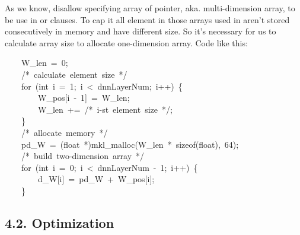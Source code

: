 \documentclass{article}
\begin{document}
\noindent{}As we know,  disallow specifying array of pointer, aka. multi-dimension array, to be use in  or  clauses. To cap it all element in those arrays used in  aren't stored consecutively in memory and have different size. So it's necessary for us to calculate array size to allocate one-dimension array. Code like this:%
\begin{mdpre}%
\noindent~~~~{W\_len}~=~{0};\\
~~~~{/*}{~calculate~element~size~}{*/}\\
~~~~{for}~({int}~i~=~{1};~i~\textless{}~dnnLayerNum;~i++)~\{\\
~~~~~~~~{W\_pos}[i~-~{1}]~=~{W\_len};\\
~~~~~~~~{W\_len}~+=~{/*}{~i-st~element~size~}{*/};\\
~~~~\}\\
~~~~{/*}{~allocate~memory~}{*/}\\
~~~~pd\_W~=~({float}~*)mkl\_malloc({W\_len}~*~sizeof({float}),~{64});\\
~~~~{/*}{~build~two-dimension~array~}{*/}\\
~~~~{for}~({int}~i~=~{0};~i~\textless{}~dnnLayerNum~-~{1};~i++)~\{\\
~~~~~~~~d\_W[i]~=~pd\_W~+~{W\_pos}[i];\\
~~~~\}\\
\end{mdpre}
\subsection{4.2.\hspace*{0.5em} Optimization}\label{sec-openmp-optimization}%
\end{document}
